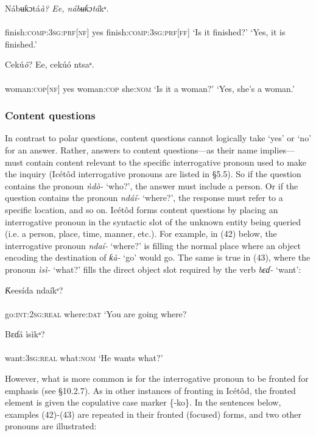 \ea\label{ex:}
\gll Nábʉƙɔtá\textit{à}\textit{?      Ee, nábʉƙɔtá}kᵃ. \\
    \\
finish:\textsc{comp:3sg:prf}[\textsc{nf}]  yes finish:\textsc{comp:3sg:prf[ff]}
\glt ‘Is it finished?’    ‘Yes, it is finished.’ 
\z




\ea\label{ex:}
\gll Cekú\textit{ô}?      Ee, cekúó     ntsaᵃ. \\
    \\
woman:\textsc{cop[nf]}    yes woman:\textsc{cop}   she:\textsc{nom}
\glt ‘Is it a woman?’    ‘Yes, she’s a woman.’ 
\z




\subsubsection{Content questions}

In contrast to polar questions, content questions cannot logically take ‘yes’ or ‘no’ for an answer. Rather, answers to content questions—as their name implies—must contain content relevant to the specific interrogative pronoun used to make the inquiry (Icétôd interrogative pronouns are listed in §5.5). So if the question contains the pronoun \textit{ǹdò-} ‘who?’, the answer must include a person. Or if the question contains the pronoun \textit{ndáí-} ‘where?’, the response must refer to a specific location, and so on. Icétôd forms content questions by placing an interrogative pronoun in the syntactic slot of the unknown entity being queried (i.e. a person, place, time, manner, etc.). For example, in (42) below, the interrogative pronoun \textit{ndaí-} ‘where?’ is filling the normal place where an object encoding the destination of \textit{ƙà-} ‘go’ would go. The same is true in (43), where the pronoun \textit{ìsì-} ‘what?’ fills the direct object slot required by the verb \textit{bɛɗ-} ‘want’:




\ea\label{ex:}
\gll Ƙeesída     ndaíkᵉ? \\
    \\
go:\textsc{int:2sg:real}   where:\textsc{dat}
\glt ‘You are going where? 
\z




\ea\label{ex:}
\gll Bɛɗá       ìsìkᵃ? \\
    \\
want:\textsc{3sg:real}   what:\textsc{nom}
\glt ‘He wants what?’ 
\z


However, what is more common is for the interrogative pronoun to be fronted for emphasis (see §10.2.7). As in other instances of fronting in Icétôd, the fronted element is given the copulative case marker \{-ko\}. In the sentences below, examples (42)-(43) are repeated in their fronted (focused) forms, and two other pronouns are illustrated:



